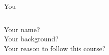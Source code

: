 \begin{frame}{You}
	\begin{columns}
		Your name?\\
		Your background?\\
		Your reason to follow this course?
	\end{columns}
\end{frame}



